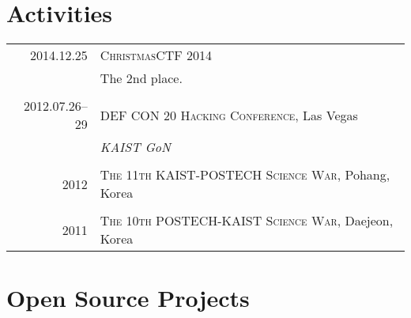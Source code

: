 \documentclass[a4paper,10pt]{article}
\begin{document}
\section{Activities}
\begin{tabular}{r|p{11cm}}
  \textsc{2014.12.25} & \textsc{ChristmasCTF 2014} \\
                      & The 2nd place. \\
  \multicolumn{2}{c}{} \\

  \textsc{2012.07.26--29} & \textsc{DEF CON 20 Hacking Conference}, Las Vegas \\
                          & \emph{KAIST GoN} \\
  \multicolumn{2}{c}{} \\

  \textsc{2012} & \textsc{The 11th KAIST-POSTECH Science War}, Pohang, Korea \\
  \multicolumn{2}{c}{} \\

  \textsc{2011} & \textsc{The 10th POSTECH-KAIST Science War}, Daejeon, Korea \\
\end{tabular}


%

\section{Open Source Projects}
\end{document}
